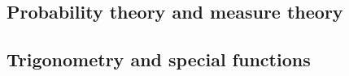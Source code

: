 

\subsection{Probability theory and measure theory}




\subsection{Trigonometry and special functions}


